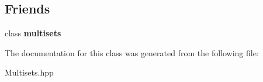 \subsection*{Friends}
\begin{DoxyCompactItemize}
\item 
\hypertarget{classdis_1_1multisets_1_1iterator_a1fad62d370233c8f18c7e81f343d056c}{class {\bfseries multisets}}\label{classdis_1_1multisets_1_1iterator_a1fad62d370233c8f18c7e81f343d056c}

\end{DoxyCompactItemize}


The documentation for this class was generated from the following file\-:\begin{DoxyCompactItemize}
\item 
Multisets.\-hpp\end{DoxyCompactItemize}
